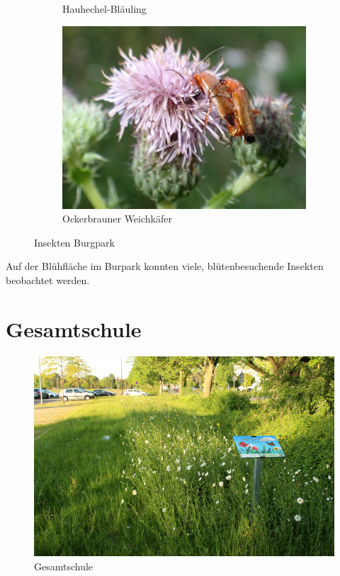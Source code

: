 \documentclass[10pt]{article}
\begin{document}
\begin{figure}[h!]
\begin{subfigure}[b]{0.48\linewidth}
    \caption{Hauhechel-Bläuling}
  \end{subfigure}
  \begin{subfigure}[b]{0.43\linewidth}
    \includegraphics[width=\linewidth]{img/weichkaefer.jpg}
    \caption{Ockerbrauner Weichkäfer}
  \end{subfigure}
  \caption{Insekten Burgpark}
\end{figure}

Auf der Blühfläche im Burpark konnten viele, blütenbesuchende Insekten beobachtet werden.

\newpage
\section{Gesamtschule}
\begin{figure}[h!]
  \includegraphics[width=\linewidth]{img/gesamtschule/mai.jpg}
  \caption{Gesamtschule}
  \label{fig:boat1}
\end{figure}
\end{document}
